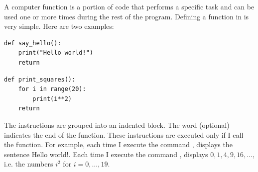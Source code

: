 \documentclass[11pt,class=report,crop=false]{standalone}
\begin{document}




\begin{cours}


A computer function is a portion of code that performs a specific task and can be used one or more times during the rest of the program. 
Defining a function in \Python{} is very simple. 
Here are two examples:
\begin{center}
\begin{minipage}{0.4\textwidth}
\begin{lstlisting}
def say_hello():
    print("Hello world!")
    return
\end{lstlisting}
\end{minipage}\qquad\qquad
\begin{minipage}{0.4\textwidth}
\begin{lstlisting}
def print_squares():
    for i in range(20):
        print(i**2)
    return
\end{lstlisting}
\end{minipage}
\end{center}


The instructions are grouped into an indented block. The word  (optional) indicates the end of the function. These instructions are executed only if I call the function. For example, each time I execute the command , \Python{} displays the sentence \og{}Hello world!\fg{}. Each time I execute the command , \Python{} displays $0,1,4,9,16,\ldots$, i.e. the numbers $i^2$ for $i=0,\ldots,19$.



\end{cours}
\end{document}
